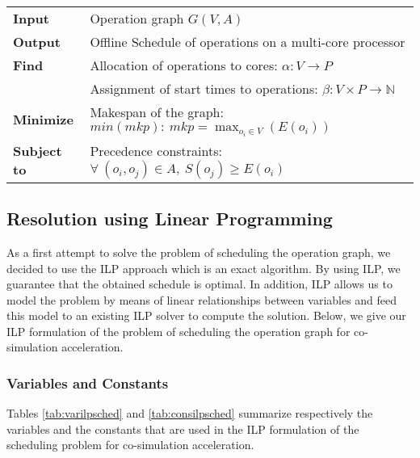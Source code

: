 \begin{table}[h]
\centering
\begin{tabular}{l  l}
  \rule{0pt}{5ex}	
	\textbf{Input} & Operation graph $G(V,A)$\\
	\rule{0pt}{5ex}									  
	
  \textbf{Output} & Offline Schedule of operations on a multi-core processor\\
	\rule{0pt}{5ex}									  
  
	\textbf{Find} & Allocation of operations to cores: $\alpha: V \rightarrow P$\\
	\rule{0pt}{5ex}
                & Assignment of start times to operations: $\beta: V \times P \rightarrow \mathbb{N}$\\
	\rule{0pt}{5ex}
	
	\textbf{Minimize} & Makespan of the graph: $min(mkp):\ mkp = \max_{o_i \in V}(E(o_i))$\\
	\rule{0pt}{5ex}									 
	
	\textbf{Subject to} & Precedence constraints: $\forall\ (o_i,o_j) \in A,\ S(o_j) \geq E(o_i)$\\
										 
\end{tabular}
\end{table}

\subsection{Resolution using Linear Programming}

As a first attempt to solve the problem of scheduling the operation graph, we decided to use the ILP approach which is an exact algorithm. By using ILP, we guarantee that the obtained schedule is optimal. In addition, ILP allows us to model the problem by means of linear relationships between variables and feed this model to an existing ILP solver to compute the solution. Below, we give our ILP formulation of the problem of scheduling the operation graph for co-simulation acceleration.

\subsubsection{Variables and Constants}

Tables \ref{tab:varilpsched} and \ref{tab:consilpsched} summarize respectively the variables and the constants that are used in the ILP formulation of the scheduling problem for co-simulation acceleration.

